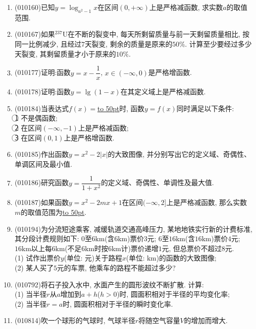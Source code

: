 \documentclass[10pt,a4paper]{article}
\newcommand{\blank}[1]{\underline{\hbox to #1pt{}}}
\newcommand{\bracket}[1]{(\hbox to #1pt{})}
\newcommand{\fourch}[4]{\par\begin{tabular}{p{.23\textwidth}p{.23\textwidth}p{.23\textwidth}p{.23\textwidth}}
A.~#1 &B.~#2& C.~#3& D.~#4
\end{tabular}}
\begin{document}
\begin{enumerate}[1.]
\textcircled{4} 浮萍每个月增加的面积都相等. 其中, 正确结论的序号是\bracket{20}.
\fourch{\textcircled{1}\textcircled{2}\textcircled{3}}{\textcircled{1}\textcircled{2}\textcircled{3}\textcircled{4}}{\textcircled{2}\textcircled{3}\textcircled{4}}{\textcircled{1}\textcircled{2}}
\item {\tiny (010160)}已知$y=\log_{a^2-1}x$在区间$(0, +\infty)$上是严格减函数, 求实数$a$的取值范围.
\item {\tiny (010167)}如果$^{237}\text{U}$在不断的裂变中, 每天所剩留质量与前一天剩留质量相比, 按同一比例减少, 且经过$7$天裂变, 剩余的质量是原来的$50\%$. 计算至少要经过多少天裂变, 其剩留质量才小于原来的$10\%$.
\item {\tiny (010177)}证明:函数$y=x-\dfrac 1x$, $x\in (-\infty, 0)$是严格增函数.
\item {\tiny (010178)}证明:函数$y=\lg (1-x)$在其定义域上是严格减函数.
\item {\tiny (010184)}当表达式$f(x)=$\blank{50}时, 函数$y=f(x)$同时满足以下条件:\\
\textcircled{1} 不是偶函数;\\
\textcircled{2} 在区间$(-\infty, -1)$上是严格减函数;\\
\textcircled{3} 在区间$(0, 1)$上是严格增函数.
\item {\tiny (010185)}作出函数$y=x^2-2|x|$的大致图像, 并分别写出它的定义域、奇偶性、单调区间及最小值.
\item {\tiny (010186)}研究函数$y=\dfrac1{1+x^2}$的定义域、奇偶性、单调性及最大值.
\item {\tiny (010187)}如果函数$y=x^2-2mx+1$在区间$(-\infty, 2]$上是严格减函数, 那么实数$m$的取值范围为\blank{50}.
\item {\tiny (010194)}为分流短途乘客, 减缓轨道交通高峰压力, 某地地铁实行新的计费标准, 其分段计费规则如下: $0$至$6\text{km}$(含$6\text{km}$)票价$3$元; $6$至$16\text{km}$(含$16\text{km}$)票价$4$元; $16\text{km}$以上每$6\text{km}$(不足$6\text{km}$时按$6\text{km}$计)票价递增$1$元, 但总票价不超过$8$元.\\
(1) 试作出票价$y$(单位: 元)关于路程$x$(单位: $\text{km}$)的函数的大致图像;\\
(2) 某人买了$5$元的车票, 他乘车的路程不能超过多少?
\item {\tiny (010792)}将石子投入水中, 水面产生的圆形波纹不断扩散. 计算:\\
(1) 当半径$r$从$a$增加到$a+h$($h>0$)时, 圆面积相对于半径的平均变化率;\\
(2) 当半径$r=a$时, 圆面积相对于半径的瞬时变化率.
\item {\tiny (010814)}吹一个球形的气球时, 气球半径$r$将随空气容量$V$的增加而增大.\\

\end{enumerate}
\end{document}

